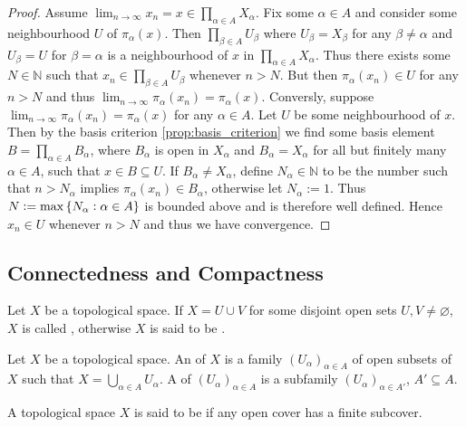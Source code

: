 \begin{proof}
	Assume $\lim_{n \to \infty} x_n = x \in \prod_{\alpha \in A}X_\alpha$. Fix some $\alpha \in A$ and consider some neighbourhood $U$ of $\pi_\alpha(x)$. Then $\prod_{\beta \in A} U_\beta$ where $U_\beta = X_\beta$ for any $\beta \neq \alpha$ and $U_\beta = U$ for $\beta = \alpha$ is a neighbourhood of $x$ in $\prod_{\alpha \in A} X_\alpha$. Thus there exists some $N \in \mathbb{N}$ such that $x_n \in \prod_{\beta \in A} U_\beta$ whenever $n > N$. But then $\pi_\alpha(x_n) \in U$ for any $n > N$ and thus $\lim_{n \to \infty} \pi_\alpha(x_n) = \pi_\alpha(x)$. Conversly, suppose $\lim_{n \to \infty} \pi_\alpha(x_n) = \pi_\alpha(x)$ for any $\alpha \in A$. Let $U$ be some neighbourhood of $x$. Then by the basis criterion \ref{prop:basis_criterion} we find some basis element $B = \prod_{\alpha \in A} B_\alpha$, where $B_\alpha$ is open in $X_\alpha$ and $B_\alpha = X_\alpha$ for all but finitely many $\alpha \in A$, such that $x \in B \subseteq U$. If $B_\alpha \neq X_\alpha$, define $N_\alpha \in \mathbb{N}$ to be the number such that $n > N_\alpha$ implies $\pi_\alpha(x_n) \in B_\alpha$, otherwise let $N_\alpha := 1$. Thus $N:=\max\cbr[0]{N_\alpha : \alpha \in A}$ is bounded above and is therefore well defined. Hence $x_n \in U$ whenever $n > N$ and thus we have convergence.	
\end{proof}

\subsection{Connectedness and Compactness}

\begin{definition}
	Let $X$ be a topological space. If $X = U \cup V$ for some disjoint open sets $U,V \neq \varnothing$, $X$ is called , otherwise $X$ is said to be .
\end{definition}

\begin{definition}
	Let $X$ be a topological space. An  of $X$ is a family $(U_\alpha)_{\alpha \in A}$ of open subsets of $X$ such that $X = \bigcup_{\alpha \in A}U_\alpha$. A  of $(U_\alpha)_{\alpha \in A}$ is a subfamily $(U_\alpha)_{\alpha \in A'}$, $A' \subseteq A$.	
\end{definition}

\begin{definition}
	A topological space $X$ is said to be  if any open cover has a finite subcover.
\end{definition}

